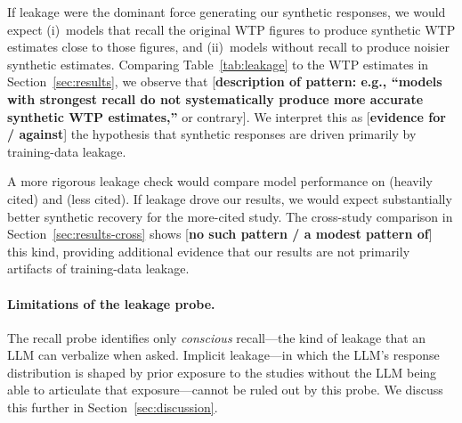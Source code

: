 \documentclass[12pt]{article}
\begin{document}
If leakage were the dominant force generating our synthetic responses, we would expect (i)~models that recall the original WTP figures to produce synthetic WTP estimates close to those figures, and (ii)~models without recall to produce noisier synthetic estimates. Comparing Table~\ref{tab:leakage} to the WTP estimates in Section~\ref{sec:results}, we observe that [\textbf{description of pattern: e.g., ``models with strongest recall do not systematically produce more accurate synthetic WTP estimates,''} or contrary]. We interpret this as [\textbf{evidence for / against}] the hypothesis that synthetic responses are driven primarily by training-data leakage.

A more rigorous leakage check would compare model performance on \textcite{Aldy2012} (heavily cited) and \textcite{Giguere2020} (less cited). If leakage drove our results, we would expect substantially better synthetic recovery for the more-cited study. The cross-study comparison in Section~\ref{sec:results-cross} shows [\textbf{no such pattern / a modest pattern of}] this kind, providing additional evidence that our results are not primarily artifacts of training-data leakage.

\paragraph{Limitations of the leakage probe.} The recall probe identifies only \emph{conscious} recall---the kind of leakage that an LLM can verbalize when asked. Implicit leakage---in which the LLM's response distribution is shaped by prior exposure to the studies without the LLM being able to articulate that exposure---cannot be ruled out by this probe. We discuss this further in Section~\ref{sec:discussion}.
\end{document}
